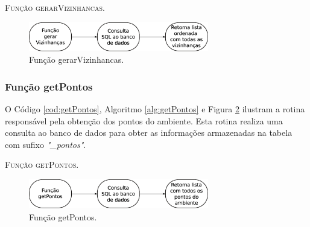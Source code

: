 

\begin{algorithm}[H]
   \SetAlgoLined   
   
   \caption{\textsc{Função gerarVizinhancas.}}
   \label{alg:gerarVizinhancas}
\end{algorithm}

\begin{figure}[H]
  \centering
  \includegraphics[width=0.7\textwidth]{Figuras/Simula/Fluxos/gerarVizinhancas.eps}
  \caption{Função gerarVizinhancas.}
  \label{fig:gerarVizinhancas}
\end{figure} 

\newpage

\subsubsection{Função getPontos}

O Código \ref{cod:getPontos}, Algoritmo \ref{alg:getPontos} e Figura \ref{fig:getPontos} ilustram a rotina responsável pela obtenção dos pontos do ambiente. Esta rotina realiza uma consulta ao banco de dados para obter as informações armazenadas na tabela com sufixo \textit{"\_pontos"}.   



\begin{algorithm}[H]
   \SetAlgoLined   
   
   \caption{\textsc{Função getPontos.}}
   \label{alg:getPontos}
\end{algorithm}

\begin{figure}[H]
  \centering
  \includegraphics[width=0.7\textwidth]{Figuras/Simula/Fluxos/getPontos.eps}
  \caption{Função getPontos.}
  \label{fig:getPontos}
\end{figure} 

